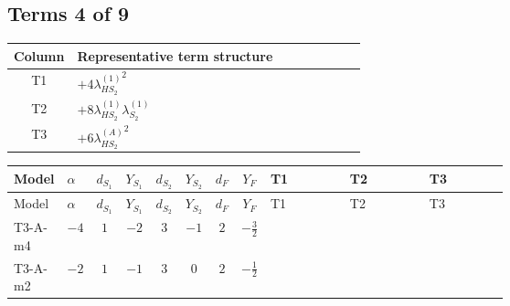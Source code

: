 \documentclass[8pt]{article}
\begin{document}
\begin{landscape}
\subsection*{Terms 4 of 9}
\begin{center}
\begin{tabular}{@{}c >{\raggedright\arraybackslash}p{0.82\linewidth}@{}}
\toprule
Column & Representative term structure \\
\midrule
T1 & \(\displaystyle +4 {\lambda_{HS_2}^{(1)}}^2\) \\
\midrule
T2 & \(\displaystyle +8 {\lambda_{HS_2}^{(1)}} {\lambda_{S_2}^{(1)}}\) \\
\midrule
T3 & \(\displaystyle +6 {\lambda_{HS_2}^{(A)}}^2\) \\
\midrule
\bottomrule
\end{tabular}
\end{center}
\smallskip
\tiny
\begin{longtable}{@{}llcccccc >{\raggedright\arraybackslash}p{0.21\linewidth} >{\raggedright\arraybackslash}p{0.21\linewidth} >{\raggedright\arraybackslash}p{0.21\linewidth}@{}}
\toprule
Model & $\alpha$ & $d_{S_1}$ & $Y_{S_1}$ & $d_{S_2}$ & $Y_{S_2}$ & $d_F$ & $Y_F$ & T1 & T2 & T3 \\
\midrule
\endfirsthead
\toprule
Model & $\alpha$ & $d_{S_1}$ & $Y_{S_1}$ & $d_{S_2}$ & $Y_{S_2}$ & $d_F$ & $Y_F$ & T1 & T2 & T3 \\
\midrule
\endhead
T3-A-m4 & $-4$ & $1$ & $-2$ & $3$ & $-1$ & $2$ & $-\frac{3}{2}$ & \scriptsize\adjustbox{max width=\linewidth}{$\begin{gathered} +4 {\lambda_{HS_2}^{(1)}}^2\end{gathered}$} & \scriptsize\adjustbox{max width=\linewidth}{$\begin{gathered} +8 {\lambda_{HS_2}^{(1)}} {\lambda_{S_2}^{(1)}}\end{gathered}$} & \scriptsize\adjustbox{max width=\linewidth}{$\begin{gathered} +6 {\lambda_{HS_2}^{(A)}}^2\end{gathered}$} \\
\midrule
T3-A-m2 & $-2$ & $1$ & $-1$ & $3$ & $0$ & $2$ & $-\frac{1}{2}$ & \scriptsize\adjustbox{max width=\linewidth}{$\begin{gathered} +4 {\lambda_{HS_2}^{(1)}}^2\end{gathered}$} & \scriptsize\adjustbox{max width=\linewidth}{$\begin{gathered} +8 {\lambda_{HS_2}^{(1)}} {\lambda_{S_2}^{(1)}}\end{gathered}$} & \scriptsize\adjustbox{max width=\linewidth}{$\begin{gathered} +6 {\lambda_{HS_2}^{(A)}}^2\end{gathered}$} \\

\end{longtable}
\end{landscape}
\end{document}
